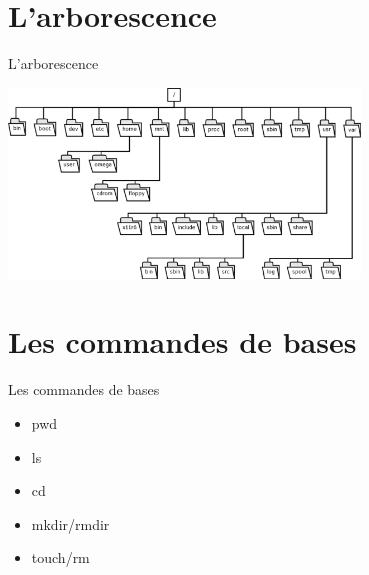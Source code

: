 \documentclass{beamer}
\begin{document}
\section{L'arborescence}
\begin{frame}{L'arborescence}
	\begin{center}
		\includegraphics[width=0.7\textwidth]{Images/arborescence.png}
	\end{center}
\end{frame}

\section{Les commandes de bases}
\begin{frame}{Les commandes de bases}
	\begin{itemize}
		\item pwd
		\item ls
		\item cd
		\item mkdir/rmdir
		\item touch/rm
	\end{itemize}
\end{frame}
\end{document}
